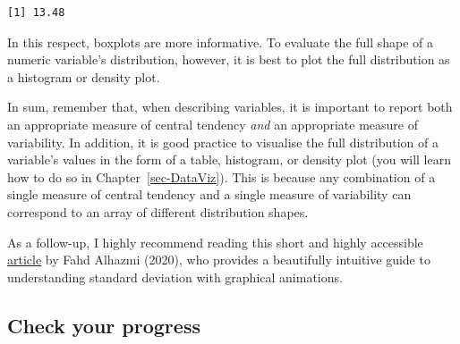 \documentclass[
  letterpaper,
  DIV=11,
  numbers=noendperiod]{scrreprt}
\newenvironment{Shaded}{\begin{snugshade}}{\end{snugshade}}
\newcommand{\AttributeTok}[1]{\textcolor[rgb]{0.40,0.45,0.13}{#1}}
\newcommand{\DecValTok}[1]{\textcolor[rgb]{0.68,0.00,0.00}{#1}}
\newcommand{\FunctionTok}[1]{\textcolor[rgb]{0.28,0.35,0.67}{#1}}
\newcommand{\NormalTok}[1]{\textcolor[rgb]{0.00,0.23,0.31}{#1}}
\newcommand{\SpecialCharTok}[1]{\textcolor[rgb]{0.37,0.37,0.37}{#1}}
\begin{document}
\begin{Shaded}
\end{Shaded}

\begin{verbatim}
[1] 13.48
\end{verbatim}

In this respect, boxplots are more informative. To evaluate the full
shape of a numeric variable's distribution, however, it is best to plot
the full distribution as a histogram or density plot.

In sum, remember that, when describing variables, it is important to
report both an appropriate measure of central tendency \emph{and} an
appropriate measure of variability. In addition, it is good practice to
visualise the full distribution of a variable's values in the form of a
table, histogram, or density plot (you will learn how to do so in
Chapter~\ref{sec-DataViz}). This is because any combination of a single
measure of central tendency and a single measure of variability can
correspond to an array of different distribution shapes.

\begin{tcolorbox}[enhanced jigsaw, arc=.35mm, bottomrule=.15mm, bottomtitle=1mm, breakable, colback=white, colbacktitle=quarto-callout-note-color!10!white, colframe=quarto-callout-note-color-frame, coltitle=black, left=2mm, leftrule=.75mm, opacityback=0, opacitybacktitle=0.6, rightrule=.15mm, title=\textcolor{quarto-callout-note-color}{\faInfo}\hspace{0.5em}{Developping a visual understanding of standard deviation}, titlerule=0mm, toprule=.15mm, toptitle=1mm]

As a follow-up, I highly recommend reading this short and highly
accessible
\href{https://medium.com/data-science/a-visual-interpretation-of-the-standard-deviation-30f4676c291c}{article}
by Fahd Alhazmi (2020), who provides a beautifully intuitive guide to
understanding standard deviation with graphical animations.

\end{tcolorbox}

\subsection*{Check your progress}\label{check-your-progress-15}
\end{document}
